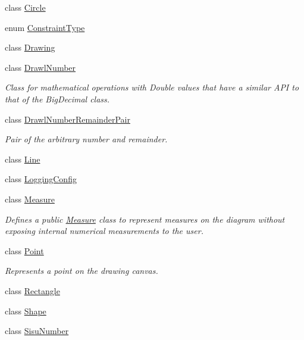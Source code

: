 \begin{DoxyCompactItemize}
\item 
class \hyperlink{classcom_1_1aarrelaakso_1_1drawl_1_1_circle}{Circle}
\item 
enum \hyperlink{enumcom_1_1aarrelaakso_1_1drawl_1_1_constraint_type}{Constraint\+Type}
\item 
class \hyperlink{classcom_1_1aarrelaakso_1_1drawl_1_1_drawing}{Drawing}
\item 
class \hyperlink{classcom_1_1aarrelaakso_1_1drawl_1_1_drawl_number}{Drawl\+Number}
\begin{DoxyCompactList}\small\item\em Class for mathematical operations with Double values that have a similar A\+PI to that of the Big\+Decimal class. \end{DoxyCompactList}\item 
class \hyperlink{classcom_1_1aarrelaakso_1_1drawl_1_1_drawl_number_remainder_pair}{Drawl\+Number\+Remainder\+Pair}
\begin{DoxyCompactList}\small\item\em Pair of the arbitrary number and remainder. \end{DoxyCompactList}\item 
class \hyperlink{classcom_1_1aarrelaakso_1_1drawl_1_1_line}{Line}
\item 
class \hyperlink{classcom_1_1aarrelaakso_1_1drawl_1_1_logging_config}{Logging\+Config}
\item 
class \hyperlink{classcom_1_1aarrelaakso_1_1drawl_1_1_measure}{Measure}
\begin{DoxyCompactList}\small\item\em Defines a public \hyperlink{classcom_1_1aarrelaakso_1_1drawl_1_1_measure}{Measure} class to represent measures on the diagram without exposing internal numerical measurements to the user. \end{DoxyCompactList}\item 
class \hyperlink{classcom_1_1aarrelaakso_1_1drawl_1_1_point}{Point}
\begin{DoxyCompactList}\small\item\em Represents a point on the drawing canvas. \end{DoxyCompactList}\item 
class \hyperlink{classcom_1_1aarrelaakso_1_1drawl_1_1_rectangle}{Rectangle}
\item 
class \hyperlink{classcom_1_1aarrelaakso_1_1drawl_1_1_shape}{Shape}
\item 
class \hyperlink{classcom_1_1aarrelaakso_1_1drawl_1_1_sisu_number}{Sisu\+Number}

\end{DoxyCompactItemize}
